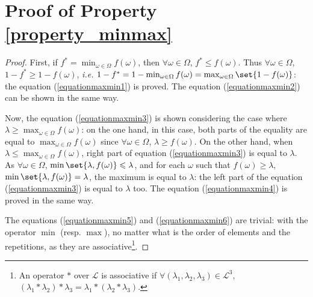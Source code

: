 \section{Proof of Property \ref{property_minmax}}
\begin{proof}
First, if $f^* = \min_{\omega \in \Omega} f(\omega) $,
then $\forall \omega \in \Omega$, $f^* \leqslant f(\omega)$.
Thus $\forall \omega \in \Omega$, $1-f^* \geqslant 1-f(\omega)$, \textit{i.e.}
$1-f^* = 1-\min_{\omega \in \Omega} f(\omega) = \max_{\omega \in \Omega} \set{ 1-f(\omega) }$:
the equation (\ref{equationmaxmin1}) is proved.
The equation (\ref{equationmaxmin2}) can be shown in the same way.

Now, the equation (\ref{equationmaxmin3}) is shown 
considering the case where $\lambda \geqslant \max_{\omega \in \Omega} f(\omega)$:
on the one hand, in this case, both parts of the equality are equal to $\max_{\omega \in \Omega} f(\omega) $
since $\forall \omega \in \Omega$, $\lambda \geqslant f(\omega)$.
On the other hand, when $\lambda \leqslant \max_{\omega \in \Omega} f(\omega)$, 
right part of equation (\ref{equationmaxmin3}) is equal to $\lambda$. 
As $\forall \omega \in \Omega$, $\min \set{ \lambda, f(\omega) } \leqslant \lambda$,
and for each $\omega$ such that $f(\omega) \geqslant \lambda$, $\min \set{ \lambda, f(\omega) } = \lambda$, 
the maximum is equal to $\lambda$: the left part of the equation (\ref{equationmaxmin3}) is equal to $\lambda$ too. 
The equation (\ref{equationmaxmin4}) is proved in the same way.

The equations (\ref{equationmaxmin5}) and (\ref{equationmaxmin6})
are trivial: with the operator $\min$ (resp. $\max$), 
no matter what is the order of elements and the repetitions,
as they are associative\footnote{ An operator $*$ over $\mathcal{L}$ is associative if $\forall (\lambda_1,\lambda_2,\lambda_3) \in \mathcal{L}^3$, $(\lambda_1 * \lambda_2) * \lambda_3 = \lambda_1 * (\lambda_2 * \lambda_3)$.}.


\end{proof}
